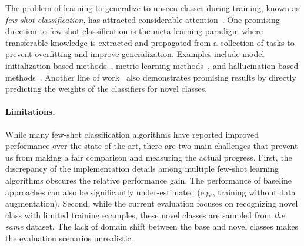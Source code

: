 The problem of learning to generalize to unseen classes during training, known as \emph{few-shot classification}, has attracted considerable attention~\cite{vinyals2016matching,snell2017prototypical,finn2017model,ravi2017optimization,sung2018learning,garcia2018few,qi2018low}. One promising direction to few-shot classification is the meta-learning paradigm where transferable knowledge is extracted and propagated from a collection of tasks to prevent overfitting and improve generalization. Examples include model initialization based methods~\cite{ravi2017optimization,finn2017model}, metric learning methods~\cite{vinyals2016matching,snell2017prototypical,sung2018learning}, and hallucination based methods~\cite{antoniou2018data,hariharan2017low,wang2018low}. Another line of work~\cite{gidaris2018dynamic,qi2018low} also demonstrates promising results by directly predicting the weights of the classifiers for novel classes. 

\paragraph{Limitations.} While many few-shot classification algorithms have reported improved performance over the state-of-the-art, there are two main challenges that prevent us from making a fair comparison and measuring the actual progress. First, the discrepancy of the implementation details among multiple few-shot learning algorithms obscures the relative performance gain. The performance of baseline approaches can also be significantly under-estimated (e.g., training without data augmentation). Second, while the current evaluation focuses on recognizing novel class with limited training examples, these novel classes are sampled from \emph{the same} dataset. The lack of domain shift between the base and novel classes makes the evaluation scenarios unrealistic. 

